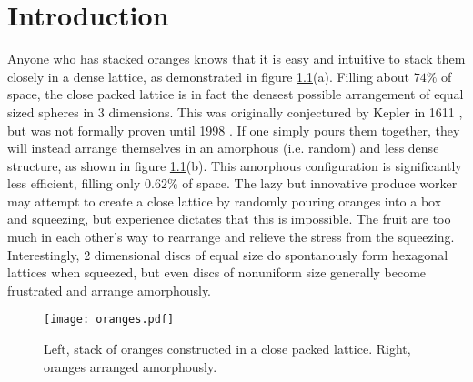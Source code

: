 \chapter{Introduction}


Anyone who has stacked oranges knows that it is easy and intuitive to stack them closely in a dense lattice, as demonstrated in figure \ref{plot:oranges}(a). Filling about $74\%$ of space, the close packed lattice is in fact the densest possible arrangement of equal sized spheres in 3 dimensions. This was originally conjectured by Kepler in 1611 \cite{kepler_strena_1611}, but was not formally proven until 1998 \cite{hales_overview_1998}. If one simply pours them together, they will instead arrange themselves in an amorphous (i.e. random) and less dense structure, as shown in figure \ref{plot:oranges}(b). This amorphous configuration is significantly less efficient, filling only  $0.62\%$ of space. The lazy but innovative produce worker may attempt to create a close lattice by randomly pouring oranges into a box and squeezing, but experience dictates that this is impossible. The fruit are too much in each other's way to rearrange and relieve the stress from the squeezing. Interestingly, 2 dimensional discs of equal size do spontanously form hexagonal lattices when squeezed, but even discs of nonuniform size generally become frustrated and arrange amorphously.

\begin{figure}[b!]

\texttt{[image: oranges.pdf]}

\caption{Left, stack of oranges constructed in a close packed lattice. Right, oranges arranged amorphously. }

\label{plot:oranges}
\end{figure}

